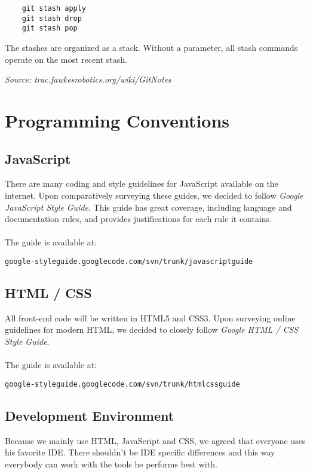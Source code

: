 \documentclass[twoside,12pt,a4paper]{article}
\begin{document}
\begin{lstlisting}
	git stash apply
	git stash drop
	git stash pop
\end{lstlisting}
\vspace*{0.25cm}

The stashes are organized as a stack. Without a parameter, all stash commands operate on the most recent stash.


\begin{flushright} \emph{Source: trac.fawkesrobotics.org/wiki/GitNotes} \end{flushright}

\section{Programming Conventions} %
\label{sec:programming_guidelines}

\subsection{JavaScript} %
\label{sub:javascript}

There are many coding and style guidelines for JavaScript available on the internet. Upon comparatively surveying these guides, we decided to follow \textit{Google JavaScript Style Guide}. This guide has great coverage, including language and documentation rules, and provides justifications for each rule it contains.  \\
\\
The guide is available at:
\begin{lstlisting} 	 
google-styleguide.googlecode.com/svn/trunk/javascriptguide
\end{lstlisting}

\subsection{HTML / CSS} %
\label{sub:htmlcss}

All front-end code will be written in HTML5 and CSS3. Upon surveying online guidelines for modern HTML, we decided to closely follow \textit{Google HTML / CSS Style Guide}. \\
\\
The guide is available at:
\begin{lstlisting} 	 
google-styleguide.googlecode.com/svn/trunk/htmlcssguide
\end{lstlisting}

\subsection{Development Environment}
Because we mainly use HTML, JavaScript and CSS, we agreed that everyone uses his favorite IDE. There shouldn't be IDE specific differences and this way everybody can work with the tools he performs best with.
\end{document}
